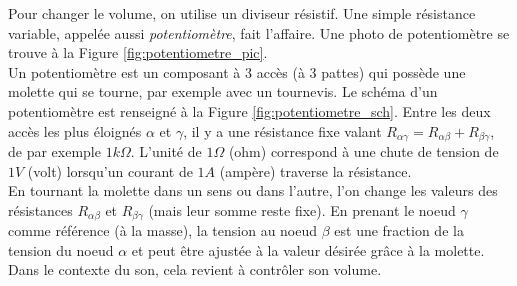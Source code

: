
Pour changer le volume, on utilise un diviseur résistif. Une simple résistance variable, appelée aussi \emph{potentiomètre}, fait l'affaire. Une photo de potentiomètre se trouve à la Figure \ref{fig:potentiometre_pic}.\\

Un potentiomètre est un composant à 3 accès (à 3 pattes) qui possède une molette qui se tourne, par exemple avec un tournevis. Le schéma d'un potentiomètre est renseigné à la Figure \ref{fig:potentiometre_sch}. Entre les deux accès les plus éloignés $\alpha$ et $\gamma$, il y a une résistance fixe valant $R_{\alpha\gamma} = R_{\alpha\beta}+R_{\beta\gamma}$, de par exemple $1k\Omega$. L'unité de $1\Omega$ (ohm) correspond à une chute de tension de $1V$ (volt) lorsqu'un courant de $1A$ (ampère) traverse la résistance.\\

En tournant la molette dans un sens ou dans l'autre, l'on change les valeurs des résistances $R_{\alpha\beta}$ et $R_{\beta\gamma}$ (mais leur somme reste fixe). En prenant le noeud $\gamma$ comme référence (à la masse), la tension au noeud $\beta$ est une fraction de la tension du noeud $\alpha$ et peut être ajustée à la valeur désirée grâce à la molette. Dans le contexte du son, cela revient à contrôler son volume.\\

